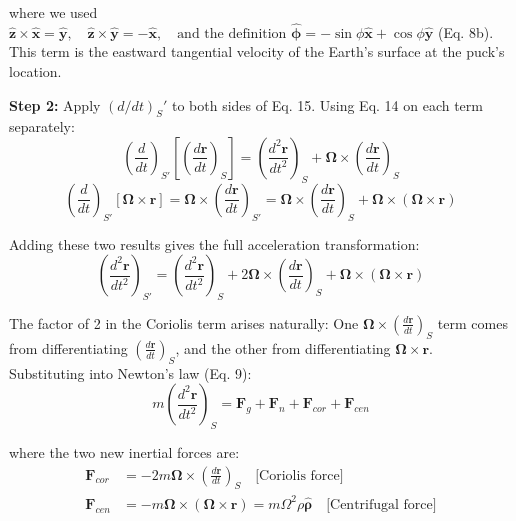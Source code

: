 \documentclass[10pt, a4paper]{article}
\begin{document}
where we used $\hat{\mathbf{z}} \times \hat{\mathbf{x}} = \hat{\mathbf{y}}, \quad \hat{\mathbf{z}} \times \hat{\mathbf{y}} = -\hat{\mathbf{x}}, \quad \text{and the definition } \hat{\boldsymbol{\phi}} = -\sin\phi \hat{\mathbf{x}} + \cos\phi \hat{\mathbf{y}}$ (Eq. 8b). This term is the eastward tangential velocity of the Earth’s surface at the puck’s location.

\textbf{Step 2:} Apply $(d/dt)_S'$ to both sides of Eq. 15. Using Eq. 14 on each term separately:
\begin{equation}
\left(\frac{d}{dt}\right)_{S'} \left[ \left(\frac{d\mathbf{r}}{dt}\right)_S \right] = \left(\frac{d^2\mathbf{r}}{dt^2}\right)_S + \boldsymbol{\Omega} \times \left(\frac{d\mathbf{r}}{dt}\right)_S
\end{equation}
\begin{equation}
\left(\frac{d}{dt}\right)_{S'} [ \boldsymbol{\Omega} \times \mathbf{r} ] = \boldsymbol{\Omega} \times \left(\frac{d\mathbf{r}}{dt}\right)_{S'} = \boldsymbol{\Omega} \times \left(\frac{d\mathbf{r}}{dt}\right)_S + \boldsymbol{\Omega} \times (\boldsymbol{\Omega} \times \mathbf{r})
\end{equation}

Adding these two results gives the full acceleration transformation:
\begin{equation}
\left(\frac{d^2\mathbf{r}}{dt^2}\right)_{S'} = \left(\frac{d^2\mathbf{r}}{dt^2}\right)_S + 2\boldsymbol{\Omega} \times \left(\frac{d\mathbf{r}}{dt}\right)_S + \boldsymbol{\Omega} \times (\boldsymbol{\Omega} \times \mathbf{r}) \label{eq:21c}
\end{equation}

The factor of 2 in the Coriolis term arises naturally: One $\boldsymbol{\Omega} \times \left( \frac{d\mathbf{r}}{dt} \right)_S$ term comes from differentiating $\left( \frac{d\mathbf{r}}{dt} \right)_S$, and the other from differentiating $\boldsymbol{\Omega} \times \mathbf{r}$. Substituting into Newton's law (Eq. 9):
\begin{equation}
m\left(\frac{d^2\mathbf{r}}{dt^2}\right)_S = \mathbf{F}_g + \mathbf{F}_n + \mathbf{F}_{cor} + \mathbf{F}_{cen} \label{eq:22}
\end{equation}

where the two new inertial forces are:
\begin{align}
\mathbf{F}_{cor} &= -2m\boldsymbol{\Omega} \times \left(\frac{d\mathbf{r}}{dt}\right)_S \quad \text{[Coriolis force]} \label{eq:23} \\
\mathbf{F}_{cen} &= -m\boldsymbol{\Omega} \times (\boldsymbol{\Omega} \times \mathbf{r}) = m\Omega^2\rho\hat{\boldsymbol{\rho}} \quad \text{[Centrifugal force]} \label{eq:24}
\end{align}
\end{document}

